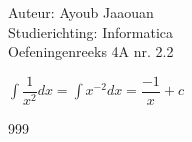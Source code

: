 \documentclass[a4paper]{article}
\begin{document}
\noindent \large Auteur: Ayoub Jaaouan \\
\noindent \large Studierichting: Informatica\\
\noindent \large Oefeningenreeks 4A nr. 2.2\\

\medskip

\normalsize

$\displaystyle\int \dfrac{1}{x^2}  dx =  \displaystyle\int x^{-2}  dx = \dfrac{-1}{x} + c$\\


\begin{thebibliography}{999}
\end{thebibliography}
\end{document}
